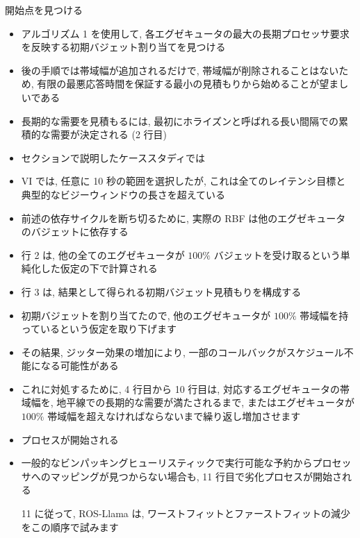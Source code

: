 \begin{frame}{開始点を見つける}
    \begin{itemize}
        \item アルゴリズム 1 を使用して, 各エグゼキュータの最大の長期プロセッサ要求を反映する初期バジェット割り当てを見つける
\item 後の手順では帯域幅が追加されるだけで, 帯域幅が削除されることはないため, 有限の最悪応答時間を保証する最小の見積もりから始めることが望ましいである
    \end{itemize}
\end{frame}

\begin{frame}{}
    \begin{itemize}
        \item 長期的な需要を見積もるには, 最初にホライズンと呼ばれる長い間隔での累積的な需要が決定される (2 行目)
\item セクションで説明したケーススタディでは
\item VI では, 任意に 10 秒の範囲を選択したが, これは全てのレイテンシ目標と典型的なビジーウィンドウの長さを超えている
\item 前述の依存サイクルを断ち切るために, 実際の RBF は他のエグゼキュータのバジェットに依存する
\item 行 2 は, 他の全てのエグゼキュータが $100 \%$ バジェットを受け取るという単純化した仮定の下で計算される
\item 行 3 は, 結果として得られる初期バジェット見積もりを構成する
    \end{itemize}
\end{frame}

\begin{frame}{}
    \begin{itemize}
        \item 初期バジェットを割り当てたので, 他のエグゼキュータが $100 \%$ 帯域幅を持っているという仮定を取り下げます
\item その結果, ジッター効果の増加により, 一部のコールバックがスケジュール不能になる可能性がある
\item これに対処するために, 4 行目から 10 行目は, 対応するエグゼキュータの帯域幅を, 地平線での長期的な需要が満たされるまで, またはエグゼキュータが $100 \%$ 帯域幅を超えなければならないまで繰り返し増加させます
\item プロセスが開始される
    \end{itemize}
\end{frame}

\begin{frame}{}
    \begin{itemize}
        \item 一般的なビンパッキングヒューリスティックで実行可能な予約からプロセッサへのマッピングが見つからない場合も, 11 行目で劣化プロセスが開始される
\item [11] に従って, ROS-Llama は, ワーストフィットとファーストフィットの減少をこの順序で試みます
    \end{itemize}
\end{frame}

